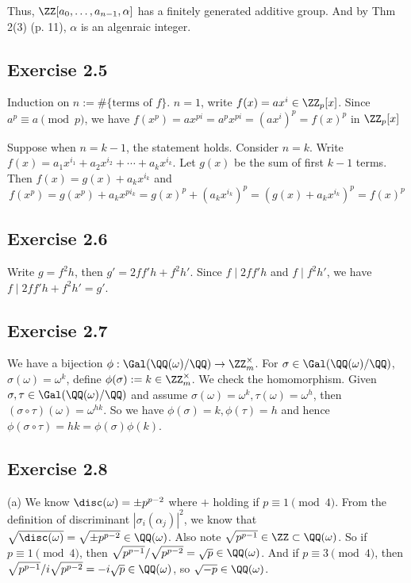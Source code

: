 \documentclass[../Chapter.tex]{subfiles}
\begin{document}
Thus, $\ZZ[a_0,\ldots,a_{n-1},\alpha]$ has a finitely generated additive group. And by Thm 2(3) (p. 11), $\alpha$ is an algenraic integer.  

\subsection*{Exercise 2.5}

Induction on $n:=\#\{\text{terms of }f\}$. $n=1$, write $f(x)=ax^i \in \ZZ_p[x]$. Since $a^p \equiv a \pmod{p}$, we have $f(x^p)=ax^{pi}=a^px^{pi}=(ax^i)^p=f(x)^p$ in $\ZZ_p[x]$

Suppose when $n=k-1$, the statement holds. Consider $n=k$. Write $f(x)=a_1x^{i_1}+a_2x^{i_2}+\cdots+a_kx^{i_k}$. Let $g(x)$ be the sum of first $k-1$ terms. Then $f(x)=g(x)+a_kx^{i_k}$ and $$f(x^p)=g(x^p)+a_kx^{pi_k}=g(x)^p+(a_kx^{i_k})^p=\left(g(x)+a_kx^{i_k}\right)^p=f(x)^p$$

\subsection*{Exercise 2.6}

Write $g=f^2h$, then $g'=2ff'h+f^2h'$. Since $f\mid 2ff'h$ and $f\mid f^2h'$, we have $f\mid 2ff'h+f^2h'=g'$.

\subsection*{Exercise 2.7}

We have a bijection $\phi: \Gal(\QQ(\omega)/\QQ)\to\ZZ_m^{\times}$. For $\sigma\in \Gal(\QQ(\omega)/\QQ)$, $\sigma(\omega)=\omega^k$, define $\phi(\sigma):=k\in\ZZ_m^{\times}$. We check the homomorphism. Given $\sigma,\tau\in\Gal(\QQ(\omega)/\QQ)$ and assume $\sigma(\omega)=\omega^k,\tau(\omega)=\omega^h$, then $(\sigma\circ\tau)(\omega)=\omega^{hk}$. So we have $\phi(\sigma)=k, \phi(\tau)=h$ and hence $\phi(\sigma\circ\tau)=hk=\phi(\sigma)\phi(k)$.

\subsection*{Exercise 2.8}

(a) We know
$\disc(\omega)=\pm p^{p-2}$ where $+$ holding if $p\equiv 1 \pmod{4}$. From the definition of discriminant $|\sigma_i(\alpha_j)|^2$, we know that $\sqrt{\disc(\omega)}=\sqrt{\pm p^{p-2}} \in \QQ(\omega)$. Also note $\sqrt{p^{p-1}} \in \ZZ \subset \QQ(\omega)$. So if $p\equiv 1 \pmod{4}$, then $\sqrt{p^{p-1}}/\sqrt{p^{p-2}} = \sqrt{p} \in \QQ(\omega)$. And if $p\equiv 3 \pmod{4}$, then $\sqrt{p^{p-1}}/i\sqrt{p^{p-2}} = -i\sqrt{p} \in \QQ(\omega)$, so $\sqrt{-p}\in\QQ(\omega)$.
\end{document}
